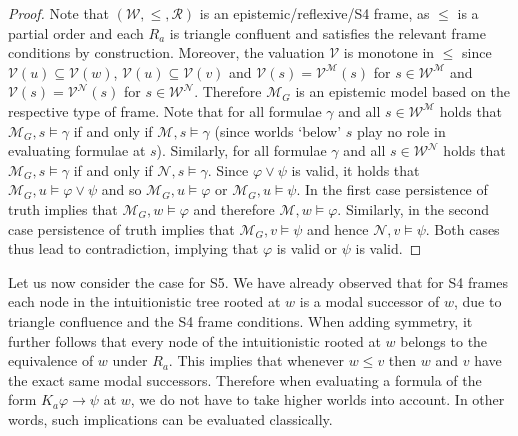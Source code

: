 \documentclass{myifcolog}
\newcommand{\agi}{a}
\newcommand{\fw}{\mathcal{M}}
\newcommand{\fv}{\mathcal{N}}
\newcommand{\W}{\mathcal{W}}
\newcommand{\rel}{\mathcal{R}}
\newcommand{\V}{\mathcal{V}}
\numberwithin{theorem}{section}
\begin{document}
\begin{proof}
    Note that $(\W, \leq, \rel)$ is an epistemic/reflexive/S4 frame, as $\leq$ is a partial order and each $R_\agi$ is triangle confluent and satisfies the relevant frame conditions by construction. Moreover, the valuation $\V$ is monotone in $\leq$ since $\V(u) \subseteq \V(w)$, $\V(u) \subseteq \V(v)$ and $\V(s) = \V^\fw(s)$ for $s \in \W^\fw$ and $\V(s) = \V^\fv(s)$ for $s \in \W^\fv$. Therefore $\fw_G$ is an epistemic model based on the respective type of frame. Note that for all formulae $\gamma$ and all $s \in \W^\fw$ holds that $\fw_G, s \models \gamma$ if and only if $\fw, s \models \gamma$ (since worlds `below' $s$ play no role in evaluating formulae at $s$). Similarly, for all formulae $\gamma$ and all $s \in \W^\fv$ holds that $\fw_G, s \models \gamma$ if and only if $\fv, s \models \gamma$. Since $\varphi \vee \psi$ is valid, it holds that $\fw_G, u \models \varphi \vee \psi$ and so $\fw_G, u \models \varphi$ or $\fw_G, u \models \psi$. In the first case persistence of truth implies that $\fw_G, w \models \varphi$ and therefore $\fw, w \models \varphi$. Similarly, in the second case persistence of truth implies that $\fw_G, v \models \psi$ and hence $\fv, v \models \psi$. Both cases thus lead to contradiction, implying that $\varphi$ is valid or $\psi$ is valid. 
\end{proof}

Let us now consider the case for S5. We have already observed that for S4 frames each node in the intuitionistic tree rooted at $w$ is a modal successor of $w$, due to triangle confluence and the S4 frame conditions. When adding symmetry, it further follows that every node of the intuitionistic rooted at $w$ belongs to the equivalence of $w$ under $R_\agi$. This implies that whenever $w \leq v$ then $w$ and $v$ have the exact same modal successors. Therefore when evaluating a formula of the form $K_\agi \varphi \rightarrow \psi$ at $w$, we do not have to take higher worlds into account. In other words, such implications can be evaluated classically.
\end{document}
